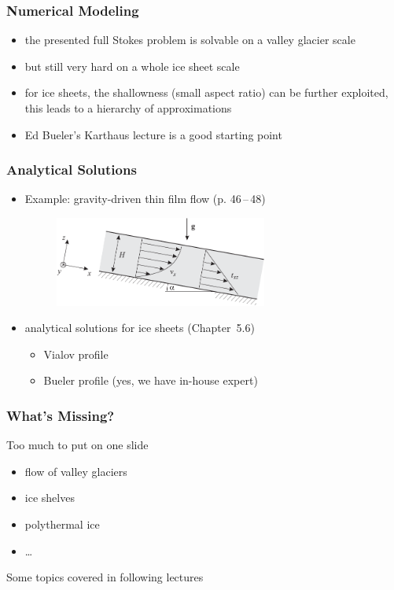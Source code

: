 \documentclass[hide notes,intlimits]{beamer}
\begin{document}
\begin{frame}
  \frametitle{Numerical Modeling}
   \begin{itemize}
   \item the presented full Stokes problem is solvable on a valley glacier scale
   \item but still very hard on a whole ice sheet scale
   \item for ice sheets, the shallowness (small aspect ratio) can be further exploited, this leads to a hierarchy of approximations
   \item Ed Bueler's Karthaus lecture is a good starting point
   \end{itemize}
\end{frame}



\begin{frame}
  \frametitle{Analytical Solutions}
   \begin{itemize}
   \item Example: gravity-driven thin film flow (p. 46\,--\,48) 
     \begin{figure}
       \includegraphics[width=7cm]{figures/fig_3_11}
    \end{figure}
   \item analytical solutions for ice sheets (Chapter~5.6)
     \begin{itemize}
     \item Vialov profile
     \item Bueler profile (yes, we have in-house expert)
     \end{itemize}
   \end{itemize}
 \end{frame}
    
\begin{frame}
  \frametitle{What's Missing?}
  Too much to put on one slide
   \begin{itemize}
   \item flow of valley glaciers
   \item ice shelves
   \item polythermal ice
   \item \ldots
   \end{itemize}
   Some topics covered in following lectures
 \end{frame}
    
\end{document}
